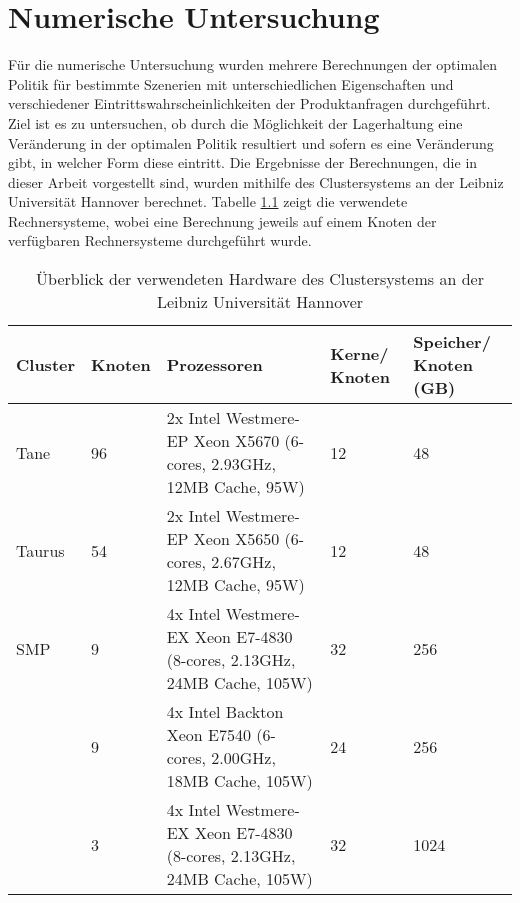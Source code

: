 \chapter{Numerische Untersuchung}
\setcounter{footnote}{97}  %

Für die numerische Untersuchung wurden mehrere Berechnungen der optimalen Politik für bestimmte Szenerien mit unterschiedlichen Eigenschaften und verschiedener Eintrittswahrscheinlichkeiten der Produktanfragen durchgeführt. Ziel ist es zu untersuchen, ob durch die Möglichkeit der Lagerhaltung eine Veränderung in der optimalen Politik resultiert und sofern es eine Veränderung gibt, in welcher Form diese eintritt. Die Ergebnisse der Berechnungen, die in dieser Arbeit vorgestellt sind, wurden mithilfe des Clustersystems an der Leibniz Universität Hannover berechnet. Tabelle \ref{Hardware} zeigt die verwendete Rechnersysteme, wobei eine Berechnung jeweils auf einem Knoten der verfügbaren Rechnersysteme durchgeführt wurde.

\begin{table}[h!]
\renewcommand{\arraystretch}{1.5}
  \begin{center}
  \begin{small}
    \caption{Überblick der verwendeten Hardware des Clustersystems an der Leibniz Universität Hannover}  \label{Hardware}
    \vspace*{3mm}
    \begin{tabular}{llp{6cm}p{1.5cm}p{1.5cm}}   %
     Cluster & Knoten  & Prozessoren & Kerne/ Knoten  & Speicher/ Knoten (GB) \\  \hline
  Tane   & 96 & 2x Intel Westmere-EP Xeon X5670 (6-cores, 2.93GHz, 12MB Cache, 95W)  & 12 & 48 \\
   Taurus  & 54 & 2x Intel Westmere-EP Xeon X5650 (6-cores, 2.67GHz, 12MB Cache, 95W)  & 12 &  48 \\
   SMP  & 9 &4x Intel Westmere-EX Xeon E7-4830 (8-cores, 2.13GHz, 24MB Cache, 105W)   & 32 & 256  \\
    & 9 & 4x Intel Backton Xeon E7540 (6-cores, 2.00GHz, 18MB Cache, 105W)   & 24 & 256 \\
      & 3 & 4x Intel Westmere-EX Xeon E7-4830 (8-cores, 2.13GHz, 24MB Cache, 105W)   & 32 & 1024  \\ \hline
    \end{tabular} \\[3mm]
    \end{small}
  \end{center}
\end{table}

